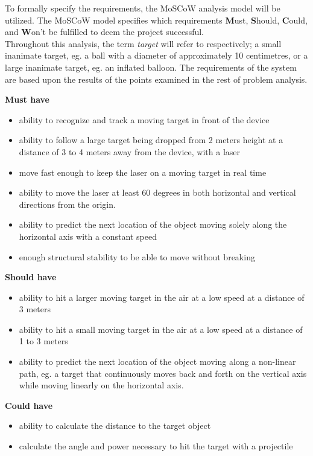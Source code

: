 To formally specify the requirements, the MoSCoW analysis model will be utilized. 
The MoSCoW model specifies which requirements \textbf{M}ust, \textbf{S}hould, \textbf{C}ould, and \textbf{W}on't be fulfilled to deem the project successful.\\

Throughout this analysis, the term \textit{target} will refer to respectively; a small inanimate target, eg{.} a ball with a diameter of approximately 10 centimetres, or a large inanimate target, eg{.} an inflated balloon.
The requirements of the system are based upon the results of the points examined in the rest of problem analysis.

\textbf{Must have}
\begin{itemize}
	\item ability to recognize and track a moving target in front of the device
	\item ability to follow a large target being dropped from 2 meters height at a distance of 3 to 4 meters away from the device, with a laser
	\item move fast enough to keep the laser on a moving target in real time
	\item ability to move the laser at least 60 degrees in both horizontal and vertical directions from the origin.
	\item ability to predict the next location of the object moving solely along the horizontal axis with a constant speed
	\item enough structural stability to be able to move without breaking
\end{itemize}

\textbf{Should have}
\begin{itemize}
	\item ability to hit a larger moving target in the air at a low speed at a distance of 3 meters
	\item ability to hit a small moving target in the air at a low speed at a distance of 1 to 3 meters
	\item ability to predict the next location of the object moving along a non-linear path, eg{.} a target that continuously moves back and forth on the vertical axis while moving linearly on the horizontal axis.
\end{itemize}

\textbf{Could have}
\begin{itemize}
	\item ability to calculate the distance to the target object
	\item calculate the angle and power necessary to hit the target with a projectile
\end{itemize}

